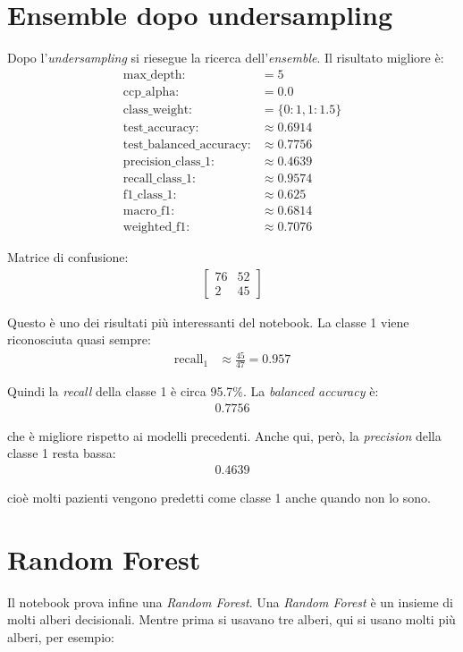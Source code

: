 \documentclass[11pt,a4paper]{article}
\begin{document}
\section{Ensemble dopo undersampling}
Dopo l'\textit{undersampling} si riesegue la ricerca dell'\textit{ensemble}. Il risultato migliore è:
\begin{align*}
    \text{max\_depth:} &= 5 \\
    \text{ccp\_alpha:} &= 0.0 \\
    \text{class\_weight:} &= \{0: 1, 1: 1.5\} \\
    \text{test\_accuracy:} &\approx 0.6914 \\
    \text{test\_balanced\_accuracy:} &\approx 0.7756 \\
    \text{precision\_class\_1:} &\approx 0.4639 \\
    \text{recall\_class\_1:} &\approx 0.9574 \\
    \text{f1\_class\_1:} &\approx 0.625 \\
    \text{macro\_f1:} &\approx 0.6814 \\
    \text{weighted\_f1:} &\approx 0.7076
\end{align*}

Matrice di confusione:
\begin{align*}
    \begin{bmatrix}
        76 & 52 \\
        2 & 45
    \end{bmatrix}
\end{align*}

Questo è uno dei risultati più interessanti del notebook. La classe 1 viene riconosciuta quasi sempre:
\begin{align*}
    \text{recall}_1 &\approx \frac{45}{47} = 0.957
\end{align*}

Quindi la \textit{recall} della classe 1 è circa 95.7\%. La \textit{balanced accuracy} è:
\begin{align*}
    0.7756
\end{align*}

che è migliore rispetto ai modelli precedenti. Anche qui, però, la \textit{precision} della classe 1 resta bassa:
\begin{align*}
    0.4639
\end{align*}

cioè molti pazienti vengono predetti come classe 1 anche quando non lo sono.

\section{Random Forest}
Il notebook prova infine una \textit{Random Forest}. Una \textit{Random Forest} è un insieme di molti alberi decisionali. Mentre prima si usavano tre alberi, qui si usano molti più alberi, per esempio:
\end{document}
